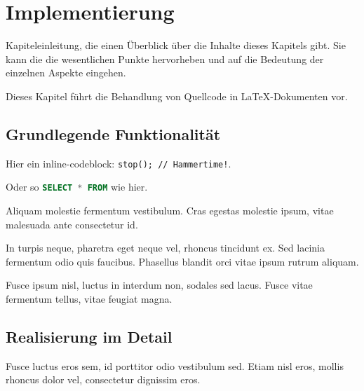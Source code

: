 \chapter{Implementierung}

Kapiteleinleitung, die einen Überblick über die Inhalte dieses Kapitels gibt. Sie kann die die wesentlichen Punkte hervorheben und auf die Bedeutung der einzelnen Aspekte eingehen.

Dieses Kapitel führt die Behandlung von Quellcode in \LaTeX-Dokumenten vor. 

\lipsum[1][1-4]

\section{Grundlegende Funktionalität}

Hier ein inline-codeblock: \lstinline[language=pseudo]{stop(); // Hammertime!}.\cite{tuoski:2022}

Oder so \lstinline[language=sql]{SELECT * FROM} wie hier.



Aliquam molestie fermentum vestibulum. Cras egestas molestie ipsum, vitae malesuada ante consectetur id. 


In turpis neque, pharetra eget neque vel, rhoncus tincidunt ex. Sed lacinia fermentum odio quis faucibus. Phasellus blandit orci vitae ipsum rutrum aliquam. 


Fusce ipsum nisl, luctus in interdum non, sodales sed lacus. Fusce vitae fermentum tellus, vitae feugiat magna. 

\bigskip
\lipsum[1]
\newpage

\section{Realisierung im Detail}

Fusce luctus eros sem, id porttitor odio vestibulum sed. Etiam nisl eros, mollis rhoncus dolor vel, consectetur dignissim eros.


